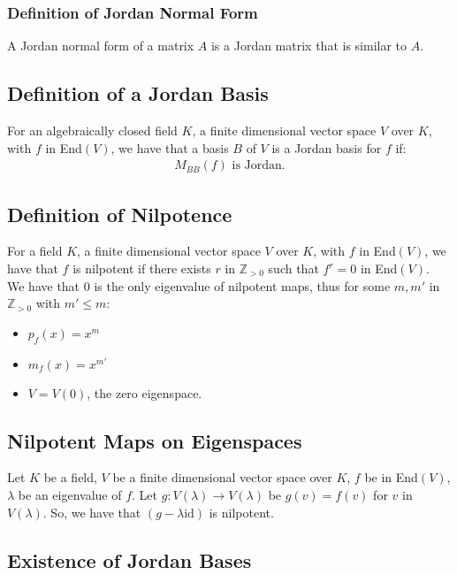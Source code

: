 \subsubsection{Definition of Jordan Normal Form}

A Jordan normal form of a matrix $A$ is a Jordan matrix that is similar to $A$.

\subsection{Definition of a Jordan Basis}

For an algebraically closed field $K$, a finite dimensional vector space $V$ over
$K$, with $f$ in End$(V)$, we have that a basis $B$ of $V$ is a Jordan basis for
$f$ if: \begin{gather*}
  M_{BB}(f) \text{ is Jordan}.
\end{gather*}

\subsection{Definition of Nilpotence}

For a field $K$, a finite dimensional vector space $V$ over $K$, 
with $f$ in End$(V)$, we have that $f$ is nilpotent if there exists $r$ in $\mathbb{Z}_{>0}$ 
such that $f^r = 0$ in End$(V)$.
\\[\baselineskip]
We have that $0$ is the only eigenvalue of nilpotent maps, thus for some
$m, m'$ in $\mathbb{Z}_{>0}$ with $m' \leq m$: \begin{itemize}
  \item $p_f(x) = x^m$
  \item $m_f(x) = x^{m'}$
  \item $V = V(0)$, the zero eigenspace.
\end{itemize}

\subsection{Nilpotent Maps on Eigenspaces}

Let $K$ be a field, $V$ be a finite dimensional vector space over $K$, 
$f$ be in End$(V)$, $\lambda$ be an eigenvalue of $f$. Let $g: V(\lambda) \to V(\lambda)$
be $g(v) = f(v)$ for $v$ in $V(\lambda)$. So, we have that $(g - \lambda\text{id})$ is
nilpotent.

\subsection{Existence of Jordan Bases}

